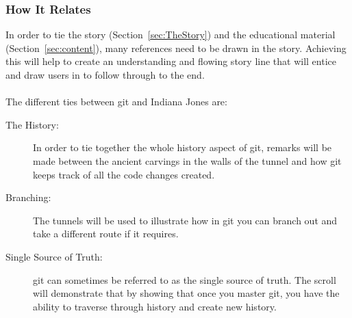 \subsubsection{How It Relates}
In order to tie the story (Section~\ref{sec:TheStory}) and the educational material (Section~\ref{sec:content}), many references need to be drawn in the story. Achieving this will help to create an understanding and flowing story line that will entice and draw users in to follow through to the end.\\\\

The different ties between \gls{git} and Indiana Jones are:
\begin{description}
	\item[The History:] In order to tie together the whole history aspect of \gls{git}, remarks will be made between the ancient carvings in the walls of the tunnel and how \gls{git} keeps track of all the code changes created.
	\item[Branching:] The tunnels will be used to illustrate how in \gls{git} you can branch out and take a different route if it requires.
	\item[Single Source of Truth:] \Gls{git} can sometimes be referred to as the single source of truth. The scroll will demonstrate that by showing that once you master \gls{git}, you have the ability to traverse through history and create new history.
\end{description}





